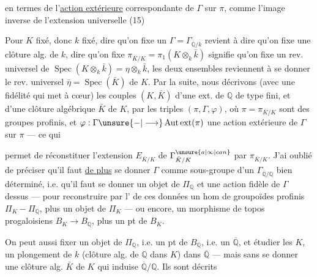 en termes de  l'\uline{action extérieure} correspondante de $\Gamma$ sur $\pi$, comme l'image inverse de l'extension universelle
\noindent (15)\quad{}

Pour $K$ fixé, donc $k$ fixé, dire qu'on fixe un $\Gamma=\Gamma_{\overline{\mathbb Q}/k}$ revient à dire qu'on fixe une clôture alg. de $k$, dire qu'on fixe  $\pi_{\bar K/K}=\pi_1(K\otimes_k\bar k)$ signifie  qu'on fixe un rev. universel de $\operatorname{Spec}(K\otimes_k\bar k)=\eta\otimes_k\bar k$,  les deux ensembles reviennent à se donner le rev. universel  $\bar\eta=\operatorname{Spec}(\bar K)$ de $K$. Par la suite, nous décrivons (avec une fidélité qui met à cœur) les couples $(K,\bar K)$ d'une ext. de $\mathbb Q$ de type fini, et d'une clôture algébrique $\bar K$ de $K$, par les triples $(\pi,\Gamma,\varphi)$, où $\pi=\pi_{\bar K/K}$  sont des groupes profinis, et $\varphi:\Gamma\unsure{-|\longrightarrow}\operatorname{Aut\,ext}(\pi)$ une action extérieure de $\Gamma$ sur $\pi$ --- ce qui

permet de réconstituer l'extension $E_{\bar K/K}$ de $\Gamma^{\unsure{a|\infty|can}}_{\bar K/K}$ par $\pi_{\bar K/K}$. J'ai oublié de préciser qu'il faut \uline{de plus} se donner $\Gamma$ comme sous-groupe d'un $\Gamma_{\overline{\mathbb Q}/\mathbb Q}$ bien déterminé, i.e. qu'il faut se donner un objet de $\Pi_{\mathbb Q}$ et une action fidèle de $\Gamma$ dessus --- pour reconstruire par l' de ces données un hom de groupoïdes profinis $\Pi_K-\Pi_{\mathbb Q}$, plus un objet de $\Pi_K$ --- ou encore, un morphisme de topos progaloisiens $B_K\longrightarrow B_{\mathbb Q}$, plus un pt de $B_K$.

On peut aussi fixer un objet de $\Pi_{\mathbb Q}$, i.e. un pt de $B_{\mathbb Q}$, i.e. un $\overline{\mathbb Q}$, et étudier les $K$,  un plongement de $k$ (clôture alg. de $\mathbb Q$ dans $K$) dans $\overline{\mathbb Q}$ ---  mais sans se donner une clôture alg. $\bar K$ de $K$ qui induise $\overline{\mathbb Q}/\mathbb Q$. Ils sont décrits

